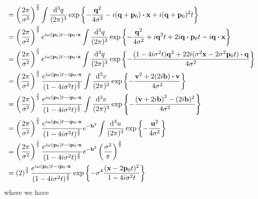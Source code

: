 \begin{example}
\begin{equation*}
\begin{split}
			&=
			\left(\frac{2\pi}{\sigma^2}\right)^{\frac{3}{2}}
			\int\frac{\dd[3]{q}}{(2\pi)^3}
			\exp\left\{
				-
				\frac{\vb{q}^2}{4\sigma^2}
				-
				i(\vb{q}+\vb{p}_0)\vdot\vb{x}
				+
				i(\vb{q}+\vb{p}_0)^2t
			\right\}
			\\
			&=
			\left(\frac{2\pi}{\sigma^2}\right)^{\frac{3}{2}}
			e^{i\omega(\vb{p}_0)t-i\vb{p}_0\vdot\vb{x}}
			\int\frac{\dd[3]{q}}{(2\pi)^3}
			\exp\left\{
				-
				\frac{\vb{q}^2}{4\sigma^2}
				+
				i\vb{q}^2t
				+
				2i\vb{q}\vdot\vb{p}_0t
				-
				i\vb{q}\vdot\vb{x}
			\right\}
			\\
			&=
			\left(\frac{2\pi}{\sigma^2}\right)^{\frac{3}{2}}
			e^{i\omega(\vb{p}_0)t-i\vb{p}_0\vdot\vb{x}}
			\int\frac{\dd[3]{q}}{(2\pi)^3}
			\exp\left\{
				-
				\frac{
					(1-4i\sigma^2t)\vb{q}^2
					+
					22i(\sigma^2\vb{x}-2\sigma^2\vb{p}_0t)
					\vdot
					\vb{q}
				}{4\sigma^2}
			\right\}
			\\
			&=
			\left(\frac{2\pi}{\sigma^2}\right)^{\frac{3}{2}}
			\frac{e^{i\omega(\vb{p}_0)t-i\vb{p}_0\vdot\vb{x}}}{(1-4i\sigma^2t)^\frac{3}{2}}
			\int\frac{\dd[3]{v}}{(2\pi)^3}
			\exp\left\{
				-
				\frac{
					\vb{v}^2
					+
					2
					(2i\vb{b})
					\vdot
					\vb{v}
				}{4\sigma^2}
			\right\}
			\\
			&=
			\left(\frac{2\pi}{\sigma^2}\right)^{\frac{3}{2}}
			\frac{e^{i\omega(\vb{p}_0)t-i\vb{p}_0\vdot\vb{x}}}{(1-4i\sigma^2t)^\frac{3}{2}}
			\int\frac{\dd[3]{v}}{(2\pi)^3}
			\exp\left\{
				-
				\frac{
					\left(
						\vb{v}
						+
						2i\vb{b}
					\right)^2
					-
					(2i\vb{b})^2
				}{4\sigma^2}
			\right\}
			\\
			&=
			\left(\frac{2\pi}{\sigma^2}\right)^{\frac{3}{2}}
			\frac{e^{i\omega(\vb{p}_0)t-i\vb{p}_0\vdot\vb{x}}}{(1-4i\sigma^2t)^\frac{3}{2}}
			e^{-\vb{b}^2}
			\int\frac{\dd[3]{u}}{(2\pi)^3}
			\exp\left\{
				-
				\frac{\vb{u}^2}{4\sigma^2}
			\right\}
			\\
			&=
			\left(\frac{2\pi}{\sigma^2}\right)^{\frac{3}{2}}
			\frac{e^{i\omega(\vb{p}_0)t-i\vb{p}_0\vdot\vb{x}}}{(1-4i\sigma^2t)^\frac{3}{2}}
			e^{-\vb{b}^2}
			\left(\frac{\sigma^2}{\pi}\right)^\frac{3}{2}
			\\
			&=
			\left(2\right)^{\frac{3}{2}}
			\frac{e^{i\omega(\vb{p}_0)t-i\vb{p}_0\vdot\vb{x}}}{(1-4i\sigma^2t)^\frac{3}{2}}
			\exp\left\{
				-
				\sigma^4
				\frac{(\vb{x}-2\vb{p}_0t)^2}{1-4i\sigma^2 t}
			\right\}
		\end{split}
	\end{equation*}
	where we have
	\begin{equation*}

\end{equation*}
\end{example}
